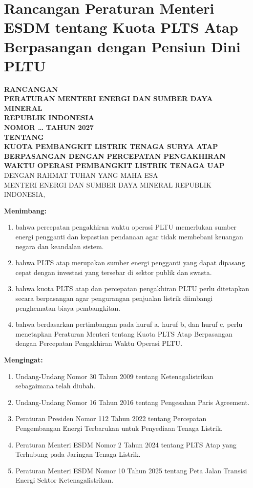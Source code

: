 \section{Rancangan Peraturan Menteri ESDM tentang Kuota PLTS Atap Berpasangan dengan Pensiun Dini PLTU}
\label{lamp:permen}

\begin{center}
\textbf{RANCANGAN}\\
\textbf{PERATURAN MENTERI ENERGI DAN SUMBER DAYA MINERAL}\\
\textbf{REPUBLIK INDONESIA}\\
\textbf{NOMOR \ldots{} TAHUN 2027}\\[4pt]
\textbf{TENTANG}\\[4pt]
\textbf{KUOTA PEMBANGKIT LISTRIK TENAGA SURYA ATAP BERPASANGAN DENGAN PERCEPATAN PENGAKHIRAN WAKTU OPERASI PEMBANGKIT LISTRIK TENAGA UAP}\\[6pt]
DENGAN RAHMAT TUHAN YANG MAHA ESA\\[4pt]
MENTERI ENERGI DAN SUMBER DAYA MINERAL REPUBLIK INDONESIA,
\end{center}

\noindent\textbf{Menimbang:}
\begin{enumerate}[label=\alph*.]
  \item bahwa percepatan pengakhiran waktu operasi PLTU memerlukan sumber energi pengganti dan kepastian pendanaan agar tidak membebani keuangan negara dan keandalan sistem.
  \item bahwa PLTS atap merupakan sumber energi pengganti yang dapat dipasang cepat dengan investasi yang tersebar di sektor publik dan swasta.
  \item bahwa kuota PLTS atap dan percepatan pengakhiran PLTU perlu ditetapkan secara berpasangan agar pengurangan penjualan listrik diimbangi penghematan biaya pembangkitan.
  \item bahwa berdasarkan pertimbangan pada huruf a, huruf b, dan huruf c, perlu menetapkan Peraturan Menteri tentang Kuota PLTS Atap Berpasangan dengan Percepatan Pengakhiran Waktu Operasi PLTU.
\end{enumerate}

\noindent\textbf{Mengingat:}
\begin{enumerate}
  \item Undang-Undang Nomor 30 Tahun 2009 tentang Ketenagalistrikan sebagaimana telah diubah.
  \item Undang-Undang Nomor 16 Tahun 2016 tentang Pengesahan Paris Agreement.
  \item Peraturan Presiden Nomor 112 Tahun 2022 tentang Percepatan Pengembangan Energi Terbarukan untuk Penyediaan Tenaga Listrik.
  \item Peraturan Menteri ESDM Nomor 2 Tahun 2024 tentang PLTS Atap yang Terhubung pada Jaringan Tenaga Listrik.
  \item Peraturan Menteri ESDM Nomor 10 Tahun 2025 tentang Peta Jalan Transisi Energi Sektor Ketenagalistrikan.
\end{enumerate}


